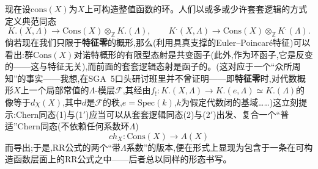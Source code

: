 \dmark{}现在设$\mathrm{cons}(X)$为$X$上可构造整值函数的环。人们以或多或少许套套逻辑的方式定义典范同态
$$K.(X,\Lambda)\to \mathrm{Cons}(X)\otimes_{\mathbb{Z}} K.(\Lambda),\qquad K^.(X,\Lambda)\to\mathrm{Cons}(X)\otimes_{\mathbb{Z}} K^.(\Lambda).$$
倘若现在我们只限于\textbf{特征零}的概形,那么(利用具真支撑的Euler--Poincaré特征)可以看出:群$\mathrm{Cons}(X)$对诺特概形的有限型态射是共变函子(此外,作为环函子,它是反变的——这与特征无关),而前面的套套逻辑态射是函子的。(这对应于一个“众所周知”的事实——我想,在SGA~5口头研讨班里并不曾证明——即\textbf{特征零}时,对代数概形$X$上一个局部常值的$\Lambda$-模层$\mathcal{F}$,其经由$f_!:K.(X,\Lambda)\to K.(e,\Lambda)\simeq K.(\Lambda)$的像等于$d\chi(X)$,其中$d$是$\mathcal{F}$的秩,$e=\mathrm{Spec}(k)$,$k$为假定代数闭的基域……)这立刻提示:Chern同态(1)与(1$'$)应当可以从套套逻辑同态(2)与(2$'$)出发、复合一个“普适”Chern同态(不依赖任何系数环$\Lambda$)
$$ch_X: \mathrm{Cons}(X)\to A(X)$$
而导出;于是,RR公式的两个“带$\Lambda$系数”的版本,便在形式上显现为包含于一条在可构造函数层面上的RR公式之中——后者总以同样的形态书写。

